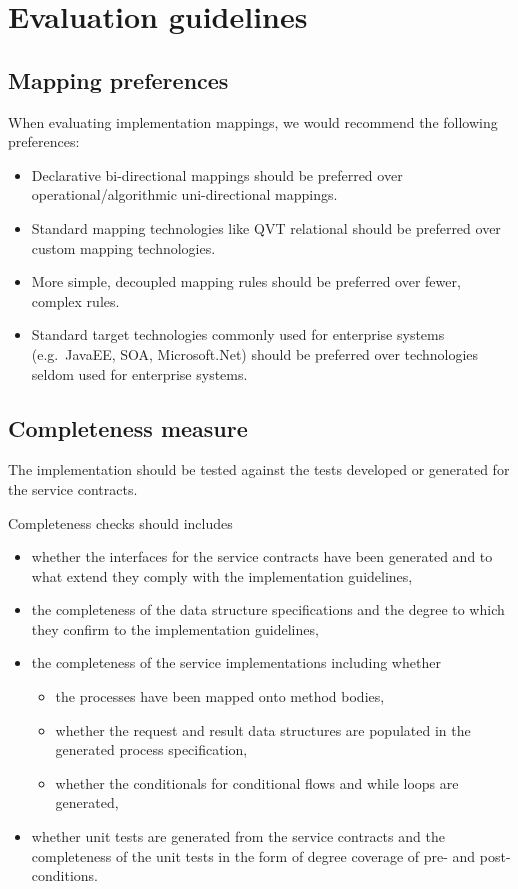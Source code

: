 \section{Evaluation guidelines}



\subsection{Mapping preferences}

When evaluating implementation mappings, we would recommend the following preferences:
\begin{itemize}
  \item Declarative bi-directional mappings should be preferred over operational/algorithmic uni-directional mappings. 
  \item Standard mapping technologies like QVT relational should be preferred over custom mapping technologies.
  \item More simple, decoupled mapping rules should be preferred over fewer, complex rules.
  \item Standard target technologies commonly used for enterprise systems (e.g.\ JavaEE, SOA, Microsoft.Net) should be preferred over technologies seldom used for enterprise systems.
\end{itemize}

\subsection{Completeness measure}
The implementation should be tested against the tests developed or generated for the service contracts. 

Completeness checks should includes
\begin{itemize}
  \item whether the interfaces for the service contracts have been generated and to what extend they comply with the implementation guidelines,
  \item the completeness of the data structure specifications and the degree to which they confirm to the implementation guidelines,
  \item the completeness of the service implementations including whether
    \begin{itemize}
     \item the processes have been mapped onto method bodies,
     \item whether the request and result data structures are populated in the generated process specification,
     \item whether the conditionals for conditional flows and while loops are generated,
    \end{itemize}
  \item whether unit tests are generated from the service contracts and the completeness of the unit tests in the form of degree coverage of pre- and post-conditions.
\end{itemize}

